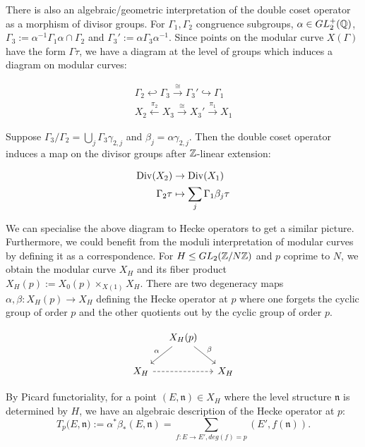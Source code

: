 There is also an algebraic/geometric interpretation of the double coset operator as a morphism of divisor groups. For $\Gamma_1, \Gamma_2$ congruence subgroups, $\alpha \in GL_2^+(\mathbb{Q}) $, $\Gamma_3 := \alpha^{-1} \Gamma_1 \alpha \cap \Gamma_2$ and $\Gamma_3' := \alpha \Gamma_3 \alpha^{-1}$. Since points on the modular curve $X(\Gamma)$ have the form $\Gamma \tau$, we have a diagram at the level of groups which induces a diagram on modular curves:


\begin{align*}
\Gamma_2 \hookleftarrow \Gamma_3 \xrightarrow{\cong} \Gamma_3' \hookrightarrow \Gamma_1 \\
X_2 \xleftarrow{\pi_2} X_3 \xrightarrow{\cong} X_3' \xrightarrow{\pi_1} X_1
\end{align*}

Suppose $\Gamma_3 / \Gamma_2 = \bigcup_j \Gamma_3 \gamma_{2,j}$ and $\beta_j = \alpha \gamma_{2,j}$. Then the double coset operator induces a map on the divisor groups after $\mathbb{Z}$-linear extension:

\begin{align*}
    \operatorname{Div}(X_2) &\rightarrow \operatorname{Div}(X_1) \\
    \Gamma_2 \tau &\mapsto \sum_j \Gamma_1 \beta_j \tau
\end{align*}

We can specialise the above diagram to Hecke operators to get a similar picture. Furthermore, we could benefit from the moduli interpretation of modular curves by defining it as a correspondence. For $H \leq GL_2(\mathbb{Z}/N\mathbb{Z})$ and $p$ coprime to $N$, we obtain the modular curve $X_H$ and its fiber product $X_H(p) := X_0(p) \times_{X(1)} X_H$. There are two degeneracy maps $\alpha,\beta: X_H(p) \rightarrow X_H$ defining the Hecke operator at $p$ where one forgets the cyclic group of order $p$ and the other quotients out by the cyclic group of order $p$.

\[
\begin{tikzcd}[column sep=small]
 & X_H(p) \arrow{dl}[swap]{\alpha} \arrow{dr}{\beta} & \\
X_H \arrow[rr,dashed] & & X_H
\end{tikzcd}
\]

By Picard functoriality, for a point $(E,\mathfrak{n}) \in X_H$ where the level structure $\mathfrak{n}$ is determined by $H$, we have an algebraic description of the Hecke operator at $p$: \[T_p(E,\mathfrak{n)} := \alpha^* \beta_* (E,\mathfrak{n}) = \sum_{f:E\rightarrow E', deg(f) = p} (E',f(\mathfrak{n})).\]

